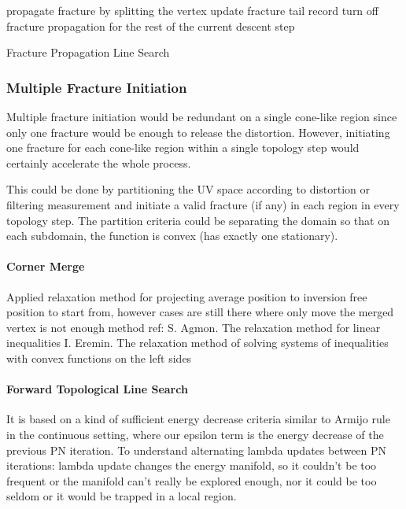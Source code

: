 \begin{algorithm}[h]
\SetAlgoLined
{}
{
  propagate fracture by splitting the vertex\;
  update fracture tail record\;
}
{
  turn off fracture propagation for the rest of the current descent step\;
}
\caption{Fracture Propagation Line Search}
\end{algorithm}



\subsubsection{Multiple Fracture Initiation}
\minchen{[TODO]}

Multiple fracture initiation would be redundant on a single cone-like region since only one fracture would be enough to release the distortion. However, initiating one fracture for each cone-like region within a single topology step would certainly accelerate the whole process.

This could be done by partitioning the UV space according to distortion or filtering measurement and initiate a valid fracture (if any) in each region in every topology step. The partition criteria could be separating the domain so that on each subdomain, the function is convex (has exactly one stationary).

\paragraph{Corner Merge} Applied relaxation method for projecting average position to inversion free position to start from, however cases are still there where only move the merged vertex is not enough
method ref:
S. Agmon. The relaxation method for linear inequalities
I. Eremin. The relaxation method of solving systems of inequalities with convex functions on the left sides

\paragraph{Forward Topological Line Search} It is based on a kind of sufficient energy decrease criteria similar to Armijo rule in the continuous setting, where our epsilon term is the energy decrease of the previous PN iteration.
To understand alternating lambda updates between PN iterations: lambda update changes the energy manifold, so it couldn't be too frequent or the manifold can't really be explored enough, nor it could be too seldom or it would be trapped in a local region.
